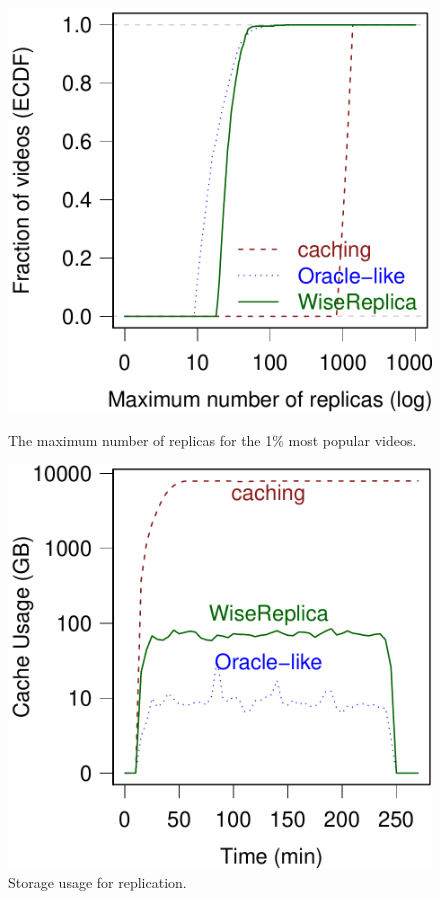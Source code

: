 \begin{figure}[htbp]
	\begin{minipage}[t]{0.48\linewidth}
		\includegraphics[width=.9\textwidth]{inputs/img/ecdf_replicas}
		\caption{The maximum number of replicas for the 1\% most popular videos.}
		\label{fig:replication_for_most_popular}
	\end{minipage}
	\hspace{0.1cm}
	\begin{minipage}[t]{0.48\linewidth}
     \includegraphics[width=.9\textwidth]{inputs/img/cache_usage}
		\caption{Storage usage for replication.}
		\label{fig:cache_usage_for_replication}
	\end{minipage}
\end{figure}


